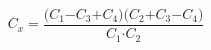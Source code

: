 \begin{equation}
\label{eqn:somelabel}
C_x\mathrm{=}\frac{\mathrm{(}C_{\mathrm{1}}\mathrm{-}C_{\mathrm{3}}\mathrm{+}C_{\mathrm{4}}\mathrm{)(}C_{\mathrm{2}}\mathrm{+}C_{\mathrm{3}}\mathrm{-}C_{\mathrm{4}}\mathrm{)}}{C_{\mathrm{1}}\mathrm{\cdot }C_{\mathrm{2}}}
\end{equation}